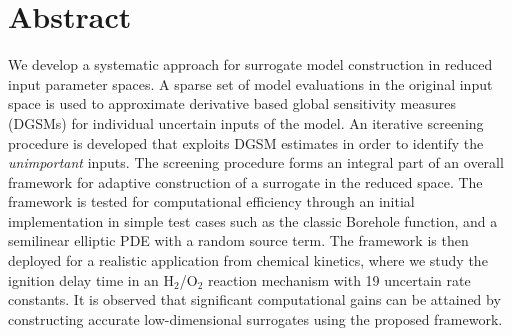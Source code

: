 \section*{Abstract}
We develop a systematic approach for surrogate model
construction in reduced input parameter spaces.
%
A sparse set of model evaluations in the original input space is used to  
approximate derivative based global sensitivity measures (DGSMs) 
for individual uncertain inputs of the model.
An iterative screening procedure is developed that exploits DGSM estimates in
order to identify the \emph{unimportant} inputs. The screening procedure forms
an integral part of an overall framework for adaptive construction of a
surrogate in the reduced space. The framework is tested for computational
efficiency through an initial implementation in simple test cases such as the
classic Borehole function, and a semilinear elliptic PDE with a random source
term. 
The framework is then deployed for a realistic application from chemical
kinetics, where we study the ignition delay time in an H$_2$/O$_2$ reaction
mechanism with 19 uncertain rate constants.  It is observed that significant
computational gains can be attained by constructing accurate low-dimensional
surrogates using the proposed framework.
 
